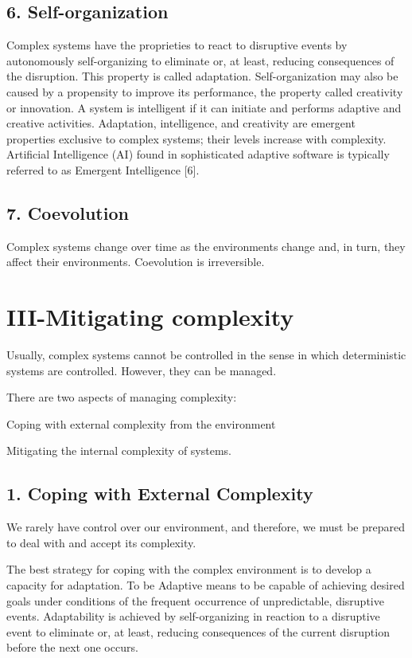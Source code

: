 \documentclass[]{article}
\begin{document}
\subsection{6. Self-organization}\label{self-organization}

Complex systems have the proprieties to react to disruptive events by
autonomously self-organizing to eliminate or, at least, reducing
consequences of the disruption. This property is called adaptation.
Self-organization may also be caused by a propensity to improve its
performance, the property called creativity or innovation. A system is
intelligent if it can initiate and performs adaptive and creative
activities. Adaptation, intelligence, and creativity are emergent
properties exclusive to complex systems; their levels increase with
complexity. Artificial Intelligence (AI) found in sophisticated adaptive
software is typically referred to as Emergent Intelligence {[}6{]}.

\subsection{7. Coevolution}\label{coevolution}

Complex systems change over time as the environments change and, in
turn, they affect their environments. Coevolution is irreversible.

\section{III-Mitigating complexity}\label{iii-mitigating-complexity}

Usually, complex systems cannot be controlled in the sense in which
deterministic systems are controlled. However, they can be managed.

There are two aspects of managing complexity:

Coping with external complexity from the environment

Mitigating the internal complexity of systems.

\subsection{1. Coping with External
Complexity}\label{coping-with-external-complexity}

We rarely have control over our environment, and therefore, we must be
prepared to deal with and accept its complexity.

The best strategy for coping with the complex environment is to develop
a capacity for adaptation. To be Adaptive means to be capable of
achieving desired goals under conditions of the frequent occurrence of
unpredictable, disruptive events. Adaptability is achieved by
self-organizing in reaction to a disruptive event to eliminate or, at
least, reducing consequences of the current disruption before the next
one occurs.
\end{document}
